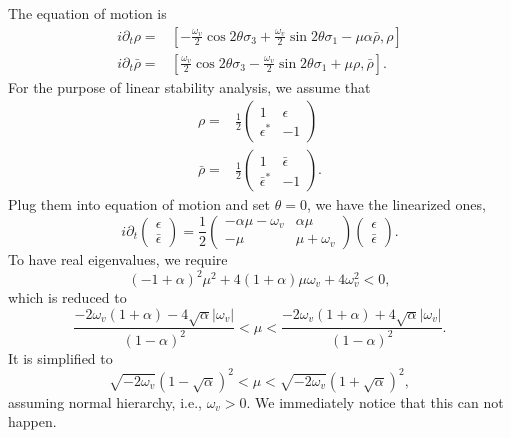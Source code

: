 The equation of motion is
\begin{align*}
   i\partial_t \rho =& \left[ -\frac{\omega_v}{2} \cos2\theta \sigma_3 + \frac{\omega_v}{2}\sin 2\theta \sigma_1 - \mu \alpha \bar \rho , \rho\right] \\
   i\partial_t \bar\rho =& \left[ \frac{\omega_v}{2} \cos2\theta \sigma_3 - \frac{\omega_v}{2}\sin 2\theta \sigma_1 + \mu \rho , \bar\rho\right].
\end{align*}
For the purpose of linear stability analysis, we assume that
\begin{align*}
   \rho =& \frac{1}{2}\begin{pmatrix}
   1 & \epsilon \\
   \epsilon^* & -1
   \end{pmatrix} \\
   \bar\rho =& \frac{1}{2}\begin{pmatrix}
   1 & \bar\epsilon \\
   \bar \epsilon^* & -1
   \end{pmatrix}.
\end{align*}
Plug them into equation of motion and set $\theta=0$, we have the linearized ones,
\begin{equation*}
   i\partial_t \begin{pmatrix}
   \epsilon \\
   \bar\epsilon
   \end{pmatrix} = \frac{1}{2}\begin{pmatrix}
   -\alpha \mu - \omega_v & \alpha \mu \\
   -\mu & \mu + \omega_v
   \end{pmatrix}\begin{pmatrix}
   \epsilon \\
   \bar\epsilon
   \end{pmatrix}.
\end{equation*}
To have real eigenvalues, we require
\begin{equation*}
   (-1+\alpha)^2 \mu^2 + 4(1+\alpha)\mu \omega_v + 4 \omega_v^2 < 0,
\end{equation*}
which is reduced to
\begin{equation*}
   \frac{ -2\omega_v (1+\alpha) - 4\sqrt{ \alpha } \lvert \omega_v \rvert  }{ (1-\alpha)^2 } < \mu < \frac{ -2\omega_v (1+\alpha) + 4\sqrt{ \alpha } \lvert \omega_v \rvert  }{ (1-\alpha)^2 }.
\end{equation*}
It is simplified to
\begin{equation*}
   \sqrt{ -2\omega_v }{ (1-\sqrt{\alpha})^2 } < \mu < \sqrt{ -2\omega_v }{ (1+\sqrt{\alpha})^2 },
\end{equation*}
assuming normal hierarchy, i.e., $\omega_v > 0$. We immediately notice that this can not happen.

